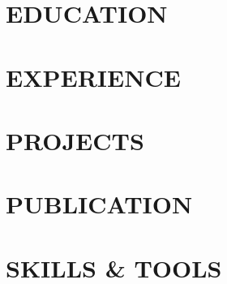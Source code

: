 \documentclass[11pt,letterpaper]{article}
\begin{document}

\section{EDUCATION}

\section{EXPERIENCE}

\section{PROJECTS}



\section{PUBLICATION}

\section{SKILLS \& TOOLS}

\end{document}
